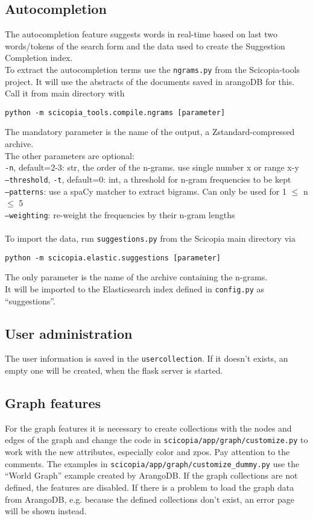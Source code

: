 \subsection{Autocompletion}
The autocompletion feature suggests words in real-time based on last two words/tokens of the search form and the data used to create the Suggestion Completion index.\\
To extract the autocompletion terms use the \texttt{ngrams.py} from the Scicopia-tools project. It will use the abstracts of the documents saved in arangoDB for this.\\
Call it from main directory with
\begin{verbatim}
python -m scicopia_tools.compile.ngrams [parameter]
\end{verbatim}
The mandatory parameter is the name of the output, a Zstandard-compressed archive.\\
The other parameters are optional:\\
\texttt{-n}, default=2-3: str, the order of the n-grams. use single number x or range x-y\\
\texttt{--threshold}, \texttt{-t}, default=0: int, a threshold for n-gram frequencies to be kept\\
\texttt{--patterns}: use a spaCy matcher to extract bigrams. Can only be used for 1 $\leq$ n $\leq$ 5\\
\texttt{--weighting}: re-weight the frequencies by their n-gram lengths\\
\\
To import the data, run \texttt{suggestions.py} from the Scicopia main directory via
\begin{verbatim}
python -m scicopia.elastic.suggestions [parameter]
\end{verbatim}
The only parameter is the name of the archive containing the n-grams.\\
It will be imported to the Elasticsearch index defined in \texttt{config.py} as ``suggestions''.

\subsection{User administration}
The user information is saved in the \texttt{usercollection}. If it doesn't exists, an empty one will be created, when the flask server is started.

\subsection{Graph features}
For the graph features it is necessary to create collections with the nodes and edges of the graph and change the code in \texttt{scicopia/app/graph/customize.py} to work with the new attributes, especially color and zpos. Pay attention to the comments. The examples in \texttt{scicopia/app/graph/customize\_dummy.py} use the ``World Graph'' example created by ArangoDB. If the graph collections are not defined, the features are disabled. If there is a problem to load the graph data from ArangoDB, e.g. because the defined collections don't exist, an error page will be shown instead.

